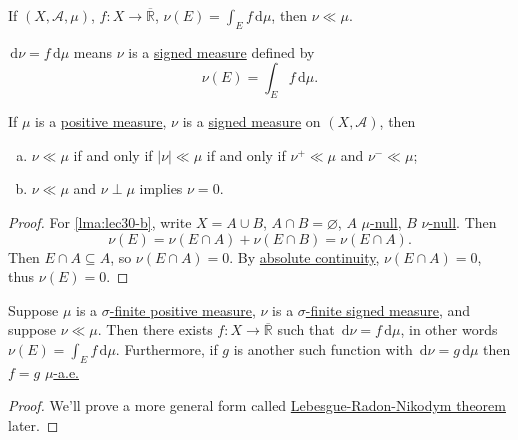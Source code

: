 \begin{eg}
	If \((X ,\mathcal{A}, \mu)\), \(f \colon X \to \overline{\mathbb{R}}\), \(\nu(E) = \int_E f \,\mathrm{d} \mu\), then \(\nu \ll \mu\).
\end{eg}

\begin{notation}
	\(\,\mathrm{d} \nu = f \,\mathrm{d} \mu\) means \(\nu\) is a \hyperref[def:signed-measure]{signed measure} defined by
	\[
		\nu(E) = \int_E f \,\mathrm{d} \mu.
	\]
\end{notation}

\begin{lemma}\label{lma:lec30}
	If \(\mu\) is a \hyperref[def:signed-measure]{positive measure}, \(\nu\) is a \hyperref[def:signed-measure]{signed measure} on \((X, \mathcal{A})\), then
	\begin{enumerate}[(a)]
		\item\label{lma:lec30-a} \(\nu \ll \mu\) if and only if \(\left\vert \nu \right\vert \ll \mu\) if and only if \(\nu^+ \ll \mu\) and \(\nu^- \ll \mu\);
		\item\label{lma:lec30-b} \(\nu \ll \mu\) and \(\nu \perp \mu\) implies \(\nu = 0\).
	\end{enumerate}
\end{lemma}

\begin{proof}
	For \autoref{lma:lec30-b}, write \(X = A \cup B\), \(A \cap B = \varnothing\), \(A\) \hyperref[def:null-set-signed-measure]{\(\mu\)-null}, \(B\) \hyperref[def:null-set-signed-measure]{\(\nu\)-null}. Then
	\[
		\nu(E) = \nu(E \cap A) + \nu(E \cap B) = \nu(E \cap A).
	\]
	Then \(E \cap A \subseteq A\), so \(\nu(E \cap A) = 0\). By \hyperref[def:absolutely-continuous-measure]{absolute continuity}, \(\nu(E \cap A) = 0\), thus \(\nu(E) = 0\).
\end{proof}

\begin{theorem}\label{thm:Radon-Nikodym}
	Suppose \(\mu\) is a \hyperref[def:finite-signed-measure]{\(\sigma\)-finite positive measure}, \(\nu\) is a \hyperref[def:finite-signed-measure]{\(\sigma\)-finite signed measure}, and suppose \(\nu \ll \mu\). Then there exists \(f \colon X \to \overline{\mathbb{R}}\) such that \(\,\mathrm{d} \nu = f \,\mathrm{d} \mu\), in other words \(\nu(E) = \int_E f \,\mathrm{d} \mu\). Furthermore, if \(g\) is another such function with \(\,\mathrm{d} \nu = g \,\mathrm{d} \mu\) then \(f = g\) \hyperref[def:mu-almost-everywhere]{\(\mu\)-a.e.}
\end{theorem}
\begin{proof}
	We'll prove a more general form called \hyperref[thm:Lebesgue-Radon-Nikodym]{Lebesgue-Radon-Nikodym theorem} later.
\end{proof}

